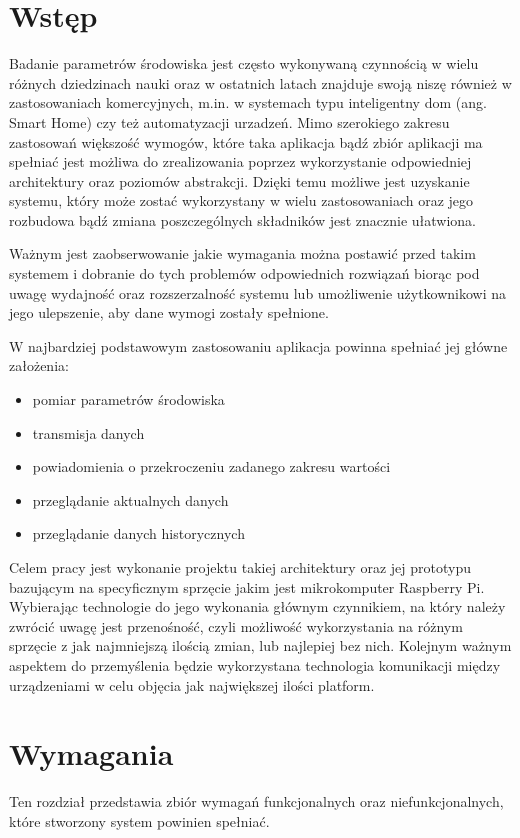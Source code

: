 \documentclass[12pt,a4paper]{article}
\author{Kacper Bajeński}
\date{2022}
\begin{document}
\tableofcontents
\newpage

\section{Wstęp}
Badanie parametrów środowiska jest często wykonywaną czynnością w wielu
różnych dziedzinach nauki oraz w ostatnich latach znajduje swoją niszę
również w zastosowaniach komercyjnych, m.in. w systemach typu inteligentny
dom (ang. Smart Home) czy też automatyzacji urzadzeń. Mimo szerokiego
zakresu zastosowań większość wymogów, które taka aplikacja bądź zbiór
aplikacji ma spełniać jest możliwa do zrealizowania poprzez wykorzystanie
odpowiedniej architektury oraz poziomów abstrakcji. Dzięki temu możliwe
jest uzyskanie systemu, który może zostać wykorzystany w wielu zastosowaniach
oraz jego rozbudowa bądź zmiana poszczególnych składników jest znacznie ułatwiona.

Ważnym jest zaobserwowanie jakie wymagania można postawić przed takim systemem i
dobranie do tych problemów odpowiednich rozwiązań biorąc pod uwagę wydajność oraz
rozszerzalność systemu lub umożliwenie użytkownikowi na jego ulepszenie, aby dane wymogi
zostały spełnione.

W najbardziej podstawowym zastosowaniu aplikacja powinna spełniać jej główne założenia:
\begin{itemize}
      \item pomiar parametrów środowiska
      \item transmisja danych
      \item powiadomienia o przekroczeniu zadanego zakresu wartości
      \item przeglądanie aktualnych danych
      \item przeglądanie danych historycznych
\end{itemize}

Celem pracy jest wykonanie projektu takiej architektury oraz jej prototypu bazującym
na specyficznym sprzęcie jakim jest mikrokomputer Raspberry Pi. Wybierając technologie do jego
wykonania głównym czynnikiem, na który należy zwrócić uwagę jest przenośność, czyli
możliwość wykorzystania na różnym sprzęcie z jak najmniejszą ilością zmian, lub najlepiej
bez nich. Kolejnym ważnym aspektem do przemyślenia będzie wykorzystana technologia
komunikacji między urządzeniami w celu objęcia jak największej ilości platform.

\section{Wymagania}
Ten rozdział przedstawia zbiór wymagań funkcjonalnych oraz niefunkcjonalnych, które
stworzony system powinien spełniać.
\end{document}
